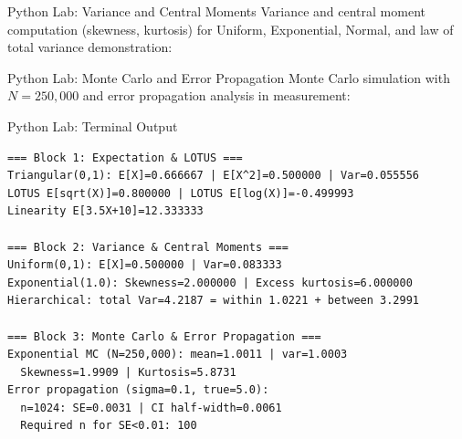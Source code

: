 \documentclass[aspectratio=169,xcolor={dvipsnames,table}]{beamer}
\begin{document}
\begin{frame}[fragile]{Python Lab: Variance and Central Moments}
	\vspace{-0.1cm}
	\scriptsize
	Variance and central moment computation (skewness, kurtosis) for Uniform, Exponential, Normal, and law of total variance demonstration:
	\vspace{0.0cm}
	{
	}
\end{frame}

\begin{frame}[fragile]{Python Lab: Monte Carlo and Error Propagation}
	\vspace{-0.05cm}
	\scriptsize
	Monte Carlo simulation with $N = 250{,}000$ and error propagation analysis in measurement:
	\vspace{0.02cm}
	{
	}
\end{frame}

\begin{frame}[fragile]{Python Lab: Terminal Output}
	\vspace{-0.1cm}
	\begin{block}{}
		\fontsize{4pt}{5pt}\selectfont
		\begin{verbatim}
=== Block 1: Expectation & LOTUS ===
Triangular(0,1): E[X]=0.666667 | E[X^2]=0.500000 | Var=0.055556
LOTUS E[sqrt(X)]=0.800000 | LOTUS E[log(X)]=-0.499993
Linearity E[3.5X+10]=12.333333

=== Block 2: Variance & Central Moments ===
Uniform(0,1): E[X]=0.500000 | Var=0.083333
Exponential(1.0): Skewness=2.000000 | Excess kurtosis=6.000000
Hierarchical: total Var=4.2187 = within 1.0221 + between 3.2991

=== Block 3: Monte Carlo & Error Propagation ===
Exponential MC (N=250,000): mean=1.0011 | var=1.0003
  Skewness=1.9909 | Kurtosis=5.8731
Error propagation (sigma=0.1, true=5.0):
  n=1024: SE=0.0031 | CI half-width=0.0061
  Required n for SE<0.01: 100
		\end{verbatim}
	\end{block}
\end{frame}
\end{document}
